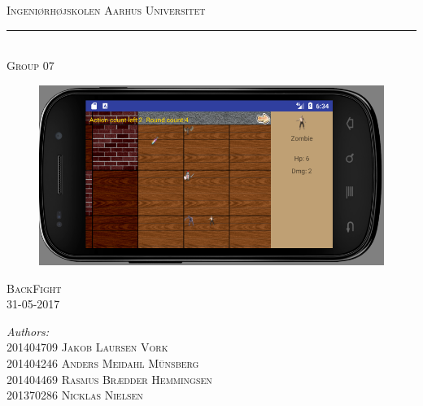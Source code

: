 \begin{titlingpage}
	\center %
	
	\textsc{\LARGE Ingeniørhøjskolen Aarhus Universitet}
	\noindent\hfil\rule{0.9\textwidth}{.4pt}\\[2.5cm]
	\textsc{Group 07}
	
	\begin{figure}[ht!]
		\centering
		\includegraphics[width=130mm]{images/FrontpageImage.png}
	\end{figure}
	

	\begin{vplace}[0.7]
		\textsc{\LARGE BackFight}\\
		\textsc{\large 31-05-2017}\\[0.5cm]		
		\vspace{15mm}
	
		\begin{minipage}{0.55\textwidth}
			\begin{flushleft} \large
				
				\emph{Authors:}\\ 
				
				201404709 \textsc{Jakob Laursen Vork}\\
				201404246 \textsc{Anders Meidahl Münsberg}\\
				201404469 \textsc{Rasmus Brædder Hemmingsen}\\
				201370286 \textsc{Nicklas Nielsen}\\
				
			\end{flushleft}
		\end{minipage}

	\end{vplace}	
\end{titlingpage}